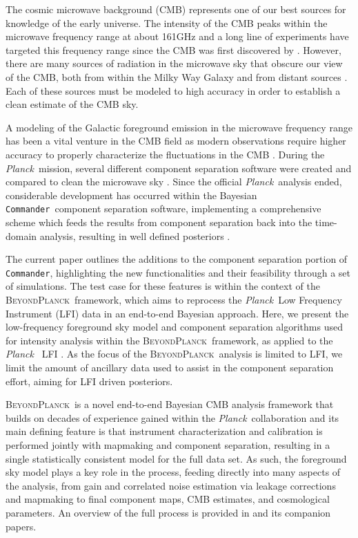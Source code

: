 \documentclass{aa}
\def\Planck{\textit{Planck}}
\def\,{\thinspace}
\def\commander{\texttt{Commander}}
\newcommand{\BP}{\textsc{BeyondPlanck}}
\begin{document}
The cosmic microwave background (CMB) represents one of our best
sources for knowledge of the early universe. The intensity of the CMB
peaks within the microwave frequency range at about 161\,GHz \citep{mather:1994} and a long line of experiments have
targeted this frequency range since the CMB was first
discovered by \citet{penzias:1965}. However, there are many sources of
radiation in the microwave sky that
obscure our view of the CMB, both from within the Milky Way Galaxy and from distant
sources \citep[see, e.g.,][and references therein]{delabrouille2012,
  planck2016-l04}. Each of these sources must be modeled to high accuracy
in order to establish a clean estimate of the CMB sky.

A modeling of the Galactic foreground emission in the microwave frequency range
has been a vital venture in the CMB field as modern observations require higher accuracy
to properly characterize the fluctuations in the CMB \citep{planck2014-a12}. During the 
\Planck\ mission, several different component separation software were created and
compared to clean the microwave sky \citep{planck2016-l04}. Since the official 
\Planck\ analysis ended, considerable development has occurred within the Bayesian
\commander\ component separation software, implementing a comprehensive scheme which
feeds the results from component separation back into the time-domain analysis, resulting
in well defined posteriors \citep{bp01}.

The current paper outlines the additions to the component separation portion
of \commander, highlighting the new functionalities and their feasibility through a
set of simulations. The test case for these features is within the context of the 
\BP\ framework, which aims to reprocess the \Planck\ Low Frequency Instrument (LFI) data in an end-to-end
Bayesian approach. Here, we present the low-frequency foreground sky model and
component separation algorithms used for intensity analysis within the \BP\ 
framework, as applied to the \Planck\ \citep{planck2016-l01} LFI
\citep{planck2016-l02}. As the focus of the \BP\ analysis is limited 
to LFI, we limit the amount of ancillary data used to assist in the component
separation effort, aiming for LFI driven posteriors.

\BP\ is a novel end-to-end Bayesian CMB analysis
framework that builds on decades of experience gained within the
\Planck\ collaboration and its main defining feature is that
instrument characterization and calibration is performed jointly with
mapmaking and component separation, resulting in a single
statistically consistent model for the full data set. As such, the
foreground sky model plays a key role in the process, feeding directly
into many aspects of the analysis, from gain and correlated noise
estimation via leakage corrections and mapmaking to final component
maps, CMB estimates, and cosmological parameters. An overview of the
full process is provided in \citet{bp01} and its companion papers.
\end{document}
